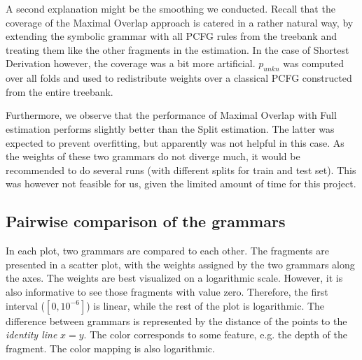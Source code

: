 A second explanation might be the smoothing we conducted. Recall that the coverage of the Maximal Overlap approach is catered in a rather natural way, by extending the symbolic grammar with all PCFG rules from the treebank and treating them like the other fragments in the estimation. In the case of Shortest Derivation however, the coverage was a bit more artificial. $p_{unkn}$ was computed over all folds and used to redistribute weights over a classical PCFG constructed from the entire treebank. 


Furthermore, we observe that the performance of Maximal Overlap with Full estimation performs slightly better than the Split estimation. The latter was expected to prevent overfitting, but apparently was not helpful in this case. As the weights of these two grammars do not diverge much, it would be recommended to do several runs (with different splits for train and test set). This was however not feasible for us, given the limited amount of time for this project.


\subsection{Pairwise comparison of the grammars}
In each plot, two grammars are compared to each other. The fragments are presented in a scatter plot, with the weights assigned by the two grammars along the axes. The weights are best visualized on a logarithmic scale. However, it is also informative to see those fragments with value zero. Therefore, the first interval ($[0,10^{-6}]$) is linear, while the rest of the plot is logarithmic. 
The difference between grammars is represented by the distance of the points to the \emph{identity line} $x=y$.
The color corresponds to some feature, e.g. the depth of the fragment. The color mapping is also logarithmic. 

